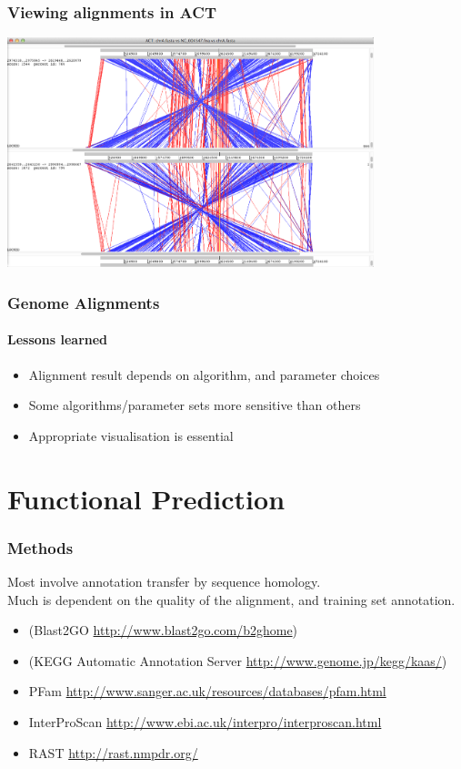 \documentclass[table]{beamer}
\begin{document}
    \begin{frame}
      \frametitle{Viewing alignments in ACT}    
      \begin{center}
        \includegraphics[width=0.8\textwidth]{images/act_wgs10}     
      \end{center}
    \end{frame}

    \begin{frame}
      \frametitle{Genome Alignments}   
      \framesubtitle{Lessons learned}   
      \begin{itemize}
        \item Alignment result depends on algorithm, and parameter choices
        \item Some algorithms/parameter sets more sensitive than others
        \item Appropriate visualisation is essential
      \end{itemize}
    \end{frame}


  \section{Functional Prediction}
    \begin{frame}
      \frametitle{Methods}   
      Most involve annotation transfer by sequence homology. \\
      Much is dependent on the quality of the alignment, and training set annotation.
      \begin{itemize}
        \item (Blast2GO \url{http://www.blast2go.com/b2ghome})
        \item (KEGG Automatic Annotation Server \url{http://www.genome.jp/kegg/kaas/})
        \item PFam \url{http://www.sanger.ac.uk/resources/databases/pfam.html}
        \item InterProScan \url{http://www.ebi.ac.uk/interpro/interproscan.html}
        \item RAST \url{http://rast.nmpdr.org/}
      \end{itemize}
    \end{frame}
\end{document}
